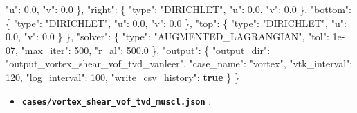 \documentclass[
  10pt,
]{article}
\newenvironment{Shaded}{}{}
\newcommand{\DataTypeTok}[1]{\textcolor[rgb]{0.56,0.13,0.00}{#1}}
\newcommand{\DecValTok}[1]{\textcolor[rgb]{0.25,0.63,0.44}{#1}}
\newcommand{\FloatTok}[1]{\textcolor[rgb]{0.25,0.63,0.44}{#1}}
\newcommand{\FunctionTok}[1]{\textcolor[rgb]{0.02,0.16,0.49}{#1}}
\newcommand{\KeywordTok}[1]{\textcolor[rgb]{0.00,0.44,0.13}{\textbf{#1}}}
\newcommand{\StringTok}[1]{\textcolor[rgb]{0.25,0.44,0.63}{#1}}
\providecommand{\tightlist}{%
  \setlength{\itemsep}{0pt}\setlength{\parskip}{0pt}}
\begin{document}
\begin{Shaded}
\begin{Highlighting}[]
      \DataTypeTok{"u"}\FunctionTok{:} \FloatTok{0.0}\FunctionTok{,}
      \DataTypeTok{"v"}\FunctionTok{:} \FloatTok{0.0}
    \FunctionTok{\},}
    \DataTypeTok{"right"}\FunctionTok{:} \FunctionTok{\{}
      \DataTypeTok{"type"}\FunctionTok{:} \StringTok{"DIRICHLET"}\FunctionTok{,}
      \DataTypeTok{"u"}\FunctionTok{:} \FloatTok{0.0}\FunctionTok{,}
      \DataTypeTok{"v"}\FunctionTok{:} \FloatTok{0.0}
    \FunctionTok{\},}
    \DataTypeTok{"bottom"}\FunctionTok{:} \FunctionTok{\{}
      \DataTypeTok{"type"}\FunctionTok{:} \StringTok{"DIRICHLET"}\FunctionTok{,}
      \DataTypeTok{"u"}\FunctionTok{:} \FloatTok{0.0}\FunctionTok{,}
      \DataTypeTok{"v"}\FunctionTok{:} \FloatTok{0.0}
    \FunctionTok{\},}
    \DataTypeTok{"top"}\FunctionTok{:} \FunctionTok{\{}
      \DataTypeTok{"type"}\FunctionTok{:} \StringTok{"DIRICHLET"}\FunctionTok{,}
      \DataTypeTok{"u"}\FunctionTok{:} \FloatTok{0.0}\FunctionTok{,}
      \DataTypeTok{"v"}\FunctionTok{:} \FloatTok{0.0}
    \FunctionTok{\}}
  \FunctionTok{\},}
  \DataTypeTok{"solver"}\FunctionTok{:} \FunctionTok{\{}
    \DataTypeTok{"type"}\FunctionTok{:} \StringTok{"AUGMENTED\_LAGRANGIAN"}\FunctionTok{,}
    \DataTypeTok{"tol"}\FunctionTok{:} \DecValTok{1e{-}07}\FunctionTok{,}
    \DataTypeTok{"max\_iter"}\FunctionTok{:} \DecValTok{500}\FunctionTok{,}
    \DataTypeTok{"r\_al"}\FunctionTok{:} \FloatTok{500.0}
  \FunctionTok{\},}
  \DataTypeTok{"output"}\FunctionTok{:} \FunctionTok{\{}
    \DataTypeTok{"output\_dir"}\FunctionTok{:} \StringTok{"output\_vortex\_shear\_vof\_tvd\_vanleer"}\FunctionTok{,}
    \DataTypeTok{"case\_name"}\FunctionTok{:} \StringTok{"vortex"}\FunctionTok{,}
    \DataTypeTok{"vtk\_interval"}\FunctionTok{:} \DecValTok{120}\FunctionTok{,}
    \DataTypeTok{"log\_interval"}\FunctionTok{:} \DecValTok{100}\FunctionTok{,}
    \DataTypeTok{"write\_csv\_history"}\FunctionTok{:} \KeywordTok{true}
  \FunctionTok{\}}
\FunctionTok{\}}
\end{Highlighting}
\end{Shaded}

\begin{itemize}
\tightlist
\item
  \textbf{\texttt{cases/vortex\_shear\_vof\_tvd\_muscl.json}} :
\end{itemize}
\end{document}
